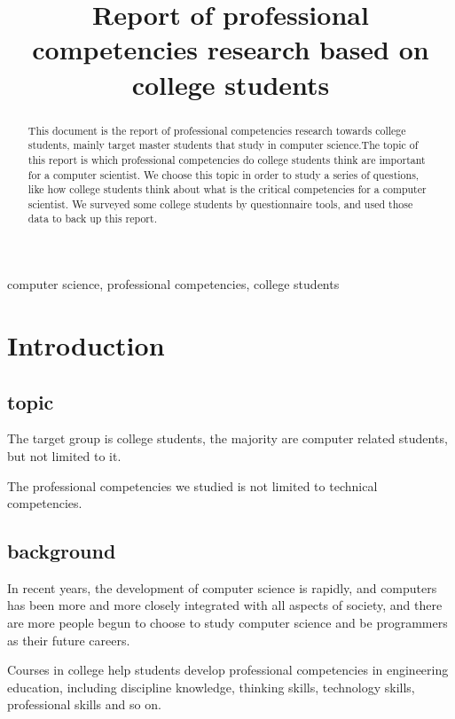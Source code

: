 \documentclass[conference]{IEEEtran}
\begin{document}
\title{Report of professional competencies research based on college students\\
}

\author{
\and
{}
\and
{}
\and
{}
}

\maketitle

\begin{abstract}
This document is the report of professional competencies research towards college students, mainly target master students that study in computer science.The topic of this report is which professional competencies do college students think are important for a computer scientist. We choose this topic in order to study a series of questions, like how college students think about what is the critical competencies for a computer scientist. We surveyed some college students by questionnaire tools, and used those data to back up this report. 
\end{abstract}

\begin{IEEEkeywords}
computer science, professional competencies, college students
\end{IEEEkeywords}

\section{Introduction}
\subsection{topic}
\par The target group is college students, the majority are computer related students, but not limited to it.
\par The professional competencies we studied is not limited to technical
competencies.

\subsection{background}
\par In recent years, the development of computer science is rapidly, and computers has been more and more closely integrated with all aspects of society, and there are more people begun to choose to study computer science and be programmers as their future careers.
\par Courses in college help students develop professional competencies in engineering education, including discipline knowledge, thinking skills, technology skills, professional skills and so on.
\end{document}
